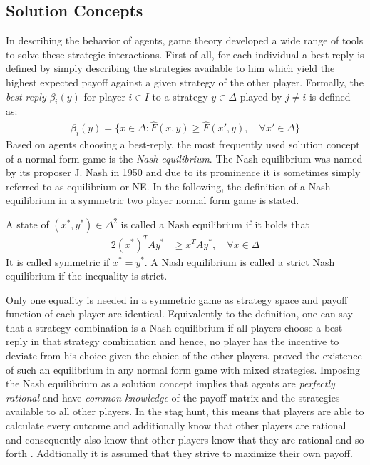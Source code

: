 \subsection{Solution Concepts}
\label{sec:traditionalconcepts}
In describing the behavior of agents, game theory developed a wide range of 
tools to solve these strategic interactions. First of all, for each individual
a best-reply is defined by simply describing the strategies available to him 
which yield the highest expected payoff against a given 
strategy of the other player.
Formally, the \textit{best-reply} $\beta_i(y)$ for player $i \in I$ to a 
strategy $y \in \Delta$ played by $j \neq i$ is defined as:
\begin{align}
        \label{eq:bestreply}
        \beta_i(y) = \{x \in \Delta: \hat{F}(x,y) \geq \hat{F}(x',y), 
        \quad \forall x' \in \Delta\}
\end{align}
Based on agents choosing a best-reply, the most frequently 
used solution concept of
a normal form game is the \textit{Nash equilibrium}.
The Nash equilibrium was named by its proposer J. Nash in 1950 
and due to its prominence it is sometimes simply referred to as equilibrium 
or NE.
In the following, the definition of a Nash equilibrium in a symmetric two
player normal form game is stated. 
\begin{mydef}
        \label{def:nashequilibrium}
        A state of $(x^*,y^*) \in \Delta^2$ is called a Nash equilibrium if 
        it holds that
        \begin{alignat*}{2}
                (x^*)^T A y^* &\geq x^T A y^*, \quad \forall x \in \Delta 
        \end{alignat*}
It is called symmetric if $x^* = y^*$. A Nash equilibrium is called a 
strict Nash equilibrium if the inequality is strict.
\end{mydef}
Only one equality is needed in a symmetric game as strategy space and
payoff function of each player are identical.
Equivalently to the definition, one can say that a strategy combination 
is a Nash equilibrium if all players choose a best-reply in that strategy 
combination and hence, no player has the incentive to deviate from his 
choice given the choice of the other players.
\textcite{nash_equilibrium_1950} proved the existence of such 
an equilibrium in any normal form game with mixed strategies. 
Imposing the Nash equilibrium as a solution concept implies that 
agents are \textit{perfectly rational} and have \textit{common knowledge} 
of the payoff matrix and the strategies available to all other players. 
In the stag hunt, this means that players are able to calculate every
outcome and additionally know that other players are rational and 
consequently also know that other players know that 
they are rational and so forth \parencite{fudenberg_theory_1998}. 
Addtionally it is assumed that they strive to maximize their own payoff.

